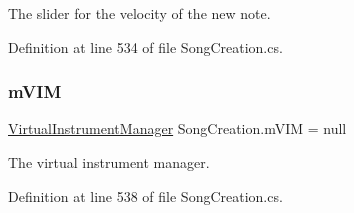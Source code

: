 The slider for the velocity of the new note. 



Definition at line 534 of file Song\+Creation.\+cs.

\mbox{\label{group___s_c_priv_var_ga1bad472098eec4194c5b18e7b3ccfd94}} 
\subsubsection{\texorpdfstring{m\+V\+IM}{mVIM}}
{\footnotesize\ttfamily \hyperlink{class_virtual_instrument_manager}{Virtual\+Instrument\+Manager} Song\+Creation.\+m\+V\+IM = null\hspace{0.3cm}{\ttfamily [private]}}



The virtual instrument manager. 



Definition at line 538 of file Song\+Creation.\+cs.

